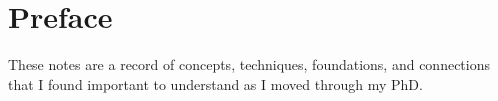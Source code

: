 \chapter*{Preface}
These notes are a record of concepts, techniques, foundations, and connections that I found important to understand as I moved through my PhD.
